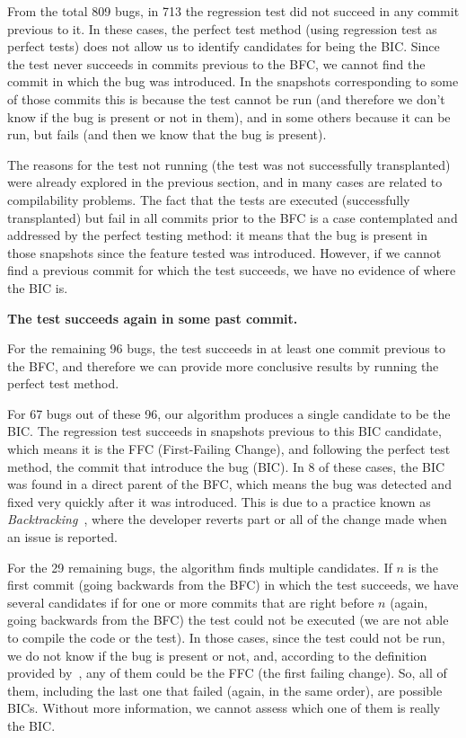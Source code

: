 From the total 809 bugs, in 713 the regression test did not succeed in any commit previous to it. 
In these cases, the perfect test method (using regression test as perfect tests) does not allow us to identify candidates for being the BIC. 
Since the test never succeeds in commits previous to the BFC, we cannot find the commit in which the bug was introduced. 
In the snapshots corresponding to some of those commits this is because the test cannot be run (and therefore we don't know if the bug is present or not in them), and in some others because it can be run, but fails (and then we know that the bug is present).

The reasons for the test not running (the test was not successfully transplanted) were already explored in the previous section, and in many cases are related to compilability problems. 
The fact that the tests are executed (successfully transplanted) but fail in all commits prior to the BFC is a case contemplated and addressed by the perfect testing method: it means that the bug is present in those snapshots since the feature tested was introduced.
However, if we cannot find a previous commit for which the test succeeds, we have no evidence of where the BIC is.

\textbf{The test succeeds again in some past commit.}

For the remaining 96 bugs, the test succeeds in at least one commit previous to the BFC, and therefore we can provide more conclusive results by running the perfect test method.

For 67 bugs out of these 96, our algorithm produces a single candidate to be the BIC. 
The regression test succeeds in snapshots previous to this BIC candidate, which means it is the FFC (First-Failing Change), and following the perfect test method, the commit that introduce the bug (BIC). 
In 8 of these cases, the BIC was found in a direct parent of the BFC, which means the bug was detected and fixed very quickly after it was introduced. 
This is due to a practice known as \textit{Backtracking}~\cite{yoon2012exploratory,yoon2014longitudinal}, where the developer reverts part or all of the change made when an issue is reported.

For the 29 remaining bugs, the algorithm finds multiple candidates. 
If $n$ is the first commit (going backwards from the BFC) in which the test succeeds, we have several candidates if for one or more commits that are right before $n$ (again, going backwards from the BFC) the test could not be executed (we are not able to compile the code or the test).
In those cases, since the test could not be run, we do not know if the bug is present or not, and, according to the definition provided by~\gema, any of them could be the FFC (the first failing change).
So, all of them, including the last one that failed (again, in the same order), are possible BICs. 
Without more information, we cannot assess which one of them is really the BIC.

